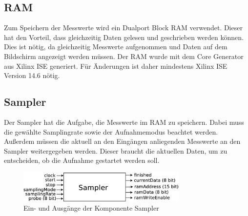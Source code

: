 \documentclass[IN,ngerman,utf8,12pt]{tumbook}
\begin{document}
\subsection{RAM}

Zum Speichern der Messwerte wird ein Dualport Block RAM verwendet.
Dieser hat den Vorteil, dass gleichzeitig Daten gelesen und geschrieben werden können.
Dies ist nötig, da gleichzeitig Messwerte aufgenommen und Daten auf dem Bildschirm angezeigt werden müssen.
Der RAM wurde mit dem Core Generator aus Xilinx ISE generiert.
Für Änderungen ist daher mindestens Xilinx ISE Version 14.6 nötig.

\subsection{Sampler}
\label{kap:sampler}

Der Sampler hat die Aufgabe, die Messwerte im RAM zu speichern.
Dabei muss die gewählte Samplingrate sowie der Aufnahmemodus beachtet werden.
Außerdem müssen die aktuell an den Eingängen anliegenden Messwerte an den Sampler weitergegeben werden.
Dieser braucht die aktuellen Daten, um zu entscheiden, ob die Aufnahme gestartet werden soll.

\begin{figure}[H]
    \centerline{
        \includegraphics[width=0.75\textwidth]{img/sampler}
    }
    \label{abb:sampler}
    \caption{Ein- und Ausgänge der Komponente Sampler}
\end{figure}
\end{document}
